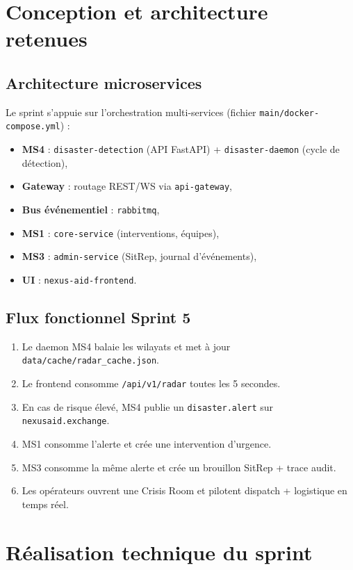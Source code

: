 \section{Conception et architecture retenues}
\subsection{Architecture microservices}
Le sprint s'appuie sur l'orchestration multi-services (fichier \texttt{main/docker-compose.yml}) :
\begin{itemize}
    \item \textbf{MS4} : \texttt{disaster-detection} (API FastAPI) + \texttt{disaster-daemon} (cycle de d\'etection),
    \item \textbf{Gateway} : routage REST/WS via \texttt{api-gateway},
    \item \textbf{Bus \'ev\'enementiel} : \texttt{rabbitmq},
    \item \textbf{MS1} : \texttt{core-service} (interventions, \'equipes),
    \item \textbf{MS3} : \texttt{admin-service} (SitRep, journal d'\'ev\'enements),
    \item \textbf{UI} : \texttt{nexus-aid-frontend}.
\end{itemize}

\subsection{Flux fonctionnel Sprint 5}
\begin{enumerate}[label=\arabic*.]
    \item Le daemon MS4 balaie les wilayats et met \`a jour \texttt{data/cache/radar\_cache.json}.
    \item Le frontend consomme \texttt{/api/v1/radar} toutes les 5 secondes.
    \item En cas de risque \'elev\'e, MS4 publie un \texttt{disaster.alert} sur \texttt{nexusaid.exchange}.
    \item MS1 consomme l'alerte et cr\'ee une intervention d'urgence.
    \item MS3 consomme la m\^eme alerte et cr\'ee un brouillon SitRep + trace audit.
    \item Les op\'erateurs ouvrent une Crisis Room et pilotent dispatch + logistique en temps r\'eel.
\end{enumerate}

\section{R\'ealisation technique du sprint}

